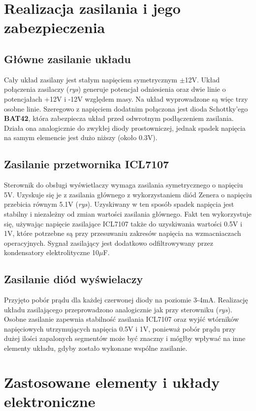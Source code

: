 \documentclass[12pt]{article}
\begin{document}
\section{Realizacja zasilania i jego zabezpieczenia}
\subsection{Główne zasilanie układu}
Cały układ zasilany jest stałym napięciem symetrycznym $\pm$12V. Układ połączenia zasilaczy (\textit{rys}) generuje potencjał odniesienia oraz dwie linie o potencjałach +12V i -12V względem masy. Na układ wyprowadzone są więc trzy osobne linie. Szeregowo z napięciem dodatnim połączona jest dioda Schottky'ego \textbf{BAT42}, która zabezpiecza układ przed odwrotnym podłączeniem zasilania. Działa ona analogicznie do zwykłej diody prostowniczej, jednak spadek napięcia na samym elemencie jest dużo niższy (około 0.3V).
\subsection{Zasilanie przetwornika ICL7107}
Sterownik do obsługi wyświetlaczy wymaga zasilania symetrycznego o napięciu 5V. Uzyskuje się je z zasilania głównego z wykorzystaniem diód Zenera o napięciu przebicia równym 5.1V (\textit{rys}). Uzyskiwany w ten sposób spadek napięcia jest stabilny i niezależny od zmian wartości zasilania głównego. Fakt ten wykorzystuje się, używając napięcie zasilające ICL7107 także do uzyskiwania wartości 0.5V i 1V, które potrzebne są przy przesuwaniu zakresów napięcia na wzmacniaczach operacyjnych. Sygnał zasilający jest dodatkowo odfiltrowywany przez kondensatory elektrolityczne 10$\mu$F.
\subsection{Zasilanie diód wyświelaczy}
Przyjęto pobór prądu dla każdej czerwonej diody na poziomie 3-4mA. Realizację układu zasilającego przeprowadzono analogicznie jak przy sterowniku (\textit{rys}). Osobne zasilanie zapewnia stabilność zasilania ICL7107 oraz wyjść wtórników napięciowych utrzymujących napięcia 0.5V i 1V, ponieważ pobór prądu przy dużej ilości zapalonych segmentów może być znaczny i mógłby wpływać na inne elementy układu, gdyby zostało wykonane wspólne zasilanie.

\section{Zastosowane elementy i układy elektroniczne}
\end{document}
